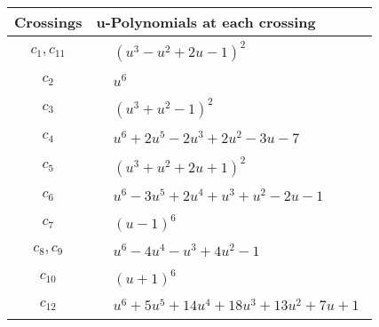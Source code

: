 \documentclass[1p]{elsarticle_modified}
\theoremstyle{definition}
\begin{document}
\begin{tabular}{m{50pt}|m{274pt}}
Crossings & \hspace{64pt}u-Polynomials at each crossing \\
\hline $$\begin{aligned}c_{1},c_{11}\end{aligned}$$&$\begin{aligned}
&(u^3- u^2+2 u-1)^2
\end{aligned}$\\
\hline $$\begin{aligned}c_{2}\end{aligned}$$&$\begin{aligned}
&u^6
\end{aligned}$\\
\hline $$\begin{aligned}c_{3}\end{aligned}$$&$\begin{aligned}
&(u^3+u^2-1)^2
\end{aligned}$\\
\hline $$\begin{aligned}c_{4}\end{aligned}$$&$\begin{aligned}
&u^6+2 u^5-2 u^3+2 u^2-3 u-7
\end{aligned}$\\
\hline $$\begin{aligned}c_{5}\end{aligned}$$&$\begin{aligned}
&(u^3+u^2+2 u+1)^2
\end{aligned}$\\
\hline $$\begin{aligned}c_{6}\end{aligned}$$&$\begin{aligned}
&u^6-3 u^5+2 u^4+u^3+u^2-2 u-1
\end{aligned}$\\
\hline $$\begin{aligned}c_{7}\end{aligned}$$&$\begin{aligned}
&(u-1)^6
\end{aligned}$\\
\hline $$\begin{aligned}c_{8},c_{9}\end{aligned}$$&$\begin{aligned}
&u^6-4 u^4- u^3+4 u^2-1
\end{aligned}$\\
\hline $$\begin{aligned}c_{10}\end{aligned}$$&$\begin{aligned}
&(u+1)^6
\end{aligned}$\\
\hline $$\begin{aligned}c_{12}\end{aligned}$$&$\begin{aligned}
&u^6+5 u^5+14 u^4+18 u^3+13 u^2+7 u+1
\end{aligned}$\\
\hline
\end{tabular}\\~\\
\end{document}

